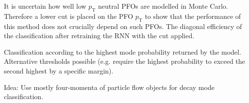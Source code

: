 It is uncertain how well low $p_\text{T}$ neutral PFOs are modelled in Monte
Carlo. Therefore a lower cut is placed on the PFO $p_\text{T}$ to show that the
performance of this method does not crucially depend on such PFOs. The diagonal
efficiency of the classification after retraining the RNN with the cut applied.

Classification according to the highest mode probability returned by the model.
Alternative thresholds possible (e.g. require the highest probability to exceed
the second highest by a specific margin).



Idea: Use mostly four-momenta of particle flow objects for decay mode
classification.


